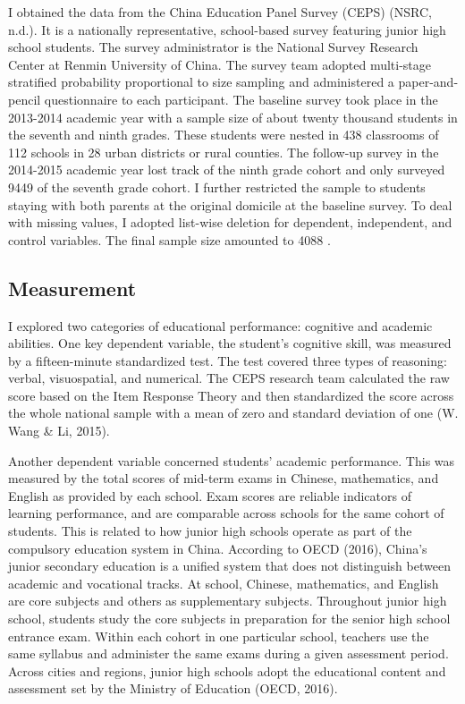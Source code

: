 \documentclass[
  man,floatsintext]{apa7}
\begin{document}
I obtained the data from the China Education Panel Survey (CEPS) (NSRC, n.d.). It is a nationally representative, school-based survey featuring junior high school students. The survey administrator is the National Survey Research Center at Renmin University of China. The survey team adopted multi-stage stratified probability proportional to size sampling and administered a paper-and-pencil questionnaire to each participant. The baseline survey took place in the 2013-2014 academic year with a sample size of about twenty thousand students in the seventh and ninth grades. These students were nested in 438 classrooms of 112 schools in 28 urban districts or rural counties. The follow-up survey in the 2014-2015 academic year lost track of the ninth grade cohort and only surveyed 9449 of the seventh grade cohort. I further restricted the sample to students staying with both parents at the original domicile at the baseline survey. To deal with missing values, I adopted list-wise deletion for dependent, independent, and control variables. The final sample size amounted to 4088 .

\hypertarget{measurement}{%
\subsection{Measurement}\label{measurement}}

I explored two categories of educational performance: cognitive and academic abilities. One key dependent variable, the student's cognitive skill, was measured by a fifteen-minute standardized test. The test covered three types of reasoning: verbal, visuospatial, and numerical. The CEPS research team calculated the raw score based on the Item Response Theory and then standardized the score across the whole national sample with a mean of zero and standard deviation of one (W. Wang \& Li, 2015).

Another dependent variable concerned students' academic performance. This was measured by the total scores of mid-term exams in Chinese, mathematics, and English as provided by each school. Exam scores are reliable indicators of learning performance, and are comparable across schools for the same cohort of students. This is related to how junior high schools operate as part of the compulsory education system in China. According to OECD (2016), China's junior secondary education is a unified system that does not distinguish between academic and vocational tracks. At school, Chinese, mathematics, and English are core subjects and others as supplementary subjects. Throughout junior high school, students study the core subjects in preparation for the senior high school entrance exam. Within each cohort in one particular school, teachers use the same syllabus and administer the same exams during a given assessment period. Across cities and regions, junior high schools adopt the educational content and assessment set by the Ministry of Education (OECD, 2016).
\end{document}
